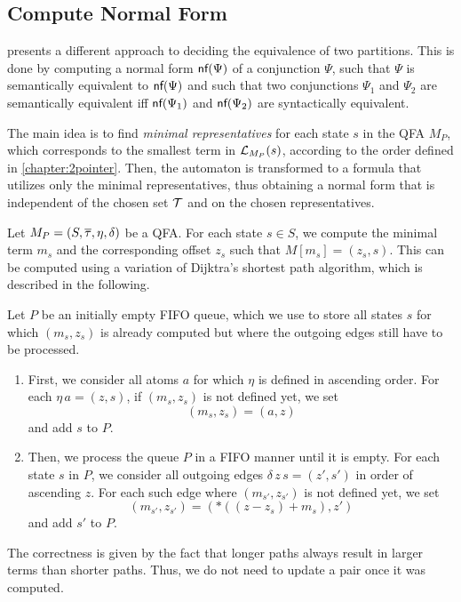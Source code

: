 \subsection{Compute Normal Form}

\textcite{2pointer} presents a different approach to deciding the equivalence of two partitions.
This is done by computing a normal form $\textsf{nf}(\Psi)$ of a conjunction $\Psi$, such that $\Psi$ is semantically equivalent to $\textsf{nf}(\Psi)$ and such that two conjunctions $\Psi_1$ and $\Psi_2$ are semantically equivalent iff $\textsf{nf}(\Psi_1)$ and $\textsf{nf}(\Psi_2)$ are syntactically equivalent.

The main idea is to find \emph{minimal representatives} for each state $s$ in the QFA $M_P$,
which corresponds to the smallest term in $\mathcal{L}_{M_P}(s)$, according to the order defined in \cref{chapter:2pointer}.
Then, the automaton is transformed to a formula that utilizes only the minimal representatives, thus obtaining a normal form that is independent of the chosen set $\mathcal{T}$ and on the chosen representatives.

Let $M_P = (S, \overline{\tau}, \eta, \delta)$ be a QFA.\@
For each state $s \in S$, we compute the minimal term $m_s$ and the corresponding offset $z_s$ such that $M[m_s] = (z_s,s)$.
This can be computed using a variation of Dijktra's shortest path algorithm, which is described in the following.

Let $P$ be an initially empty FIFO queue, which we use to store all states $s$ for which $(m_s,z_s)$ is already computed but where the outgoing edges still have to be processed.

\begin{enumerate}
    \item
          First, we consider all atoms $a$ for which $\eta$ is defined in ascending order. For each $\eta\,a = (z,s)$, if $(m_s,z_s)$ is not defined yet, we set
          \[
              (m_s,z_s) = (a,z)
          \]
          and add $s$ to $P$.
    \item
          Then, we process the queue $P$ in a FIFO manner until it is empty.
          For each state $s$ in $P$, we consider all outgoing edges $\delta\,z\,s = (z',s')$ in order of ascending $z$.
          For each such edge where $(m_{s'},z_{s'})$ is not defined yet, we set
          \[
              (m_{s'},z_{s'}) = (*((z-z_s)+m_s),z')
          \]
          and add $s'$ to $P$.
\end{enumerate}

The correctness is given by the fact that longer paths always result in larger terms than shorter paths.
Thus, we do not need to update a pair once it was computed.

